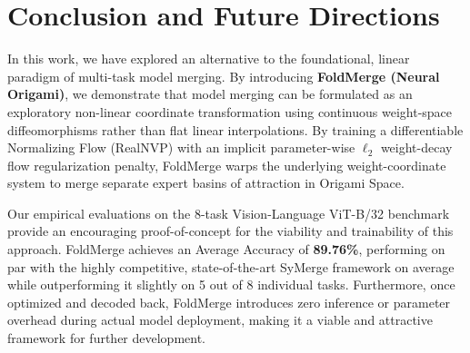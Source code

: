 \section{Conclusion and Future Directions}
\label{sec:conclusion}

In this work, we have explored an alternative to the foundational, linear paradigm of multi-task model merging. 
By introducing \textbf{FoldMerge (Neural Origami)}, we demonstrate that model merging can be formulated as an exploratory non-linear coordinate transformation using continuous weight-space diffeomorphisms rather than flat linear interpolations. 
By training a differentiable Normalizing Flow (RealNVP) with an implicit parameter-wise $\ell_2$ weight-decay flow regularization penalty, FoldMerge warps the underlying weight-coordinate system to merge separate expert basins of attraction in Origami Space. 

Our empirical evaluations on the 8-task Vision-Language ViT-B/32 benchmark provide an encouraging proof-of-concept for the viability and trainability of this approach. 
FoldMerge achieves an Average Accuracy of \textbf{89.76\%}, performing on par with the highly competitive, state-of-the-art SyMerge framework on average while outperforming it slightly on 5 out of 8 individual tasks. 
Furthermore, once optimized and decoded back, FoldMerge introduces zero inference or parameter overhead during actual model deployment, making it a viable and attractive framework for further development.

